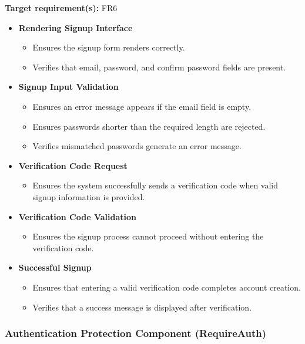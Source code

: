 \documentclass[12pt, titlepage]{article}
\begin{document}
\textbf{Target requirement(s):} FR6

\begin{itemize}

\item \textbf{Rendering Signup Interface}
\begin{itemize}
\item Ensures the signup form renders correctly.
\item Verifies that email, password, and confirm password fields are present.
\end{itemize}

\item \textbf{Signup Input Validation}
\begin{itemize}
\item Ensures an error message appears if the email field is empty.
\item Ensures passwords shorter than the required length are rejected.
\item Verifies mismatched passwords generate an error message.
\end{itemize}

\item \textbf{Verification Code Request}
\begin{itemize}
\item Ensures the system successfully sends a verification code when valid
signup information is provided.
\end{itemize}

\item \textbf{Verification Code Validation}
\begin{itemize}
\item Ensures the signup process cannot proceed without entering the
verification code.
\end{itemize}

\item \textbf{Successful Signup}
\begin{itemize}
\item Ensures that entering a valid verification code completes account creation.
\item Verifies that a success message is displayed after verification.
\end{itemize}

\end{itemize}


\subsubsection{Authentication Protection Component (RequireAuth)}
\end{document}
